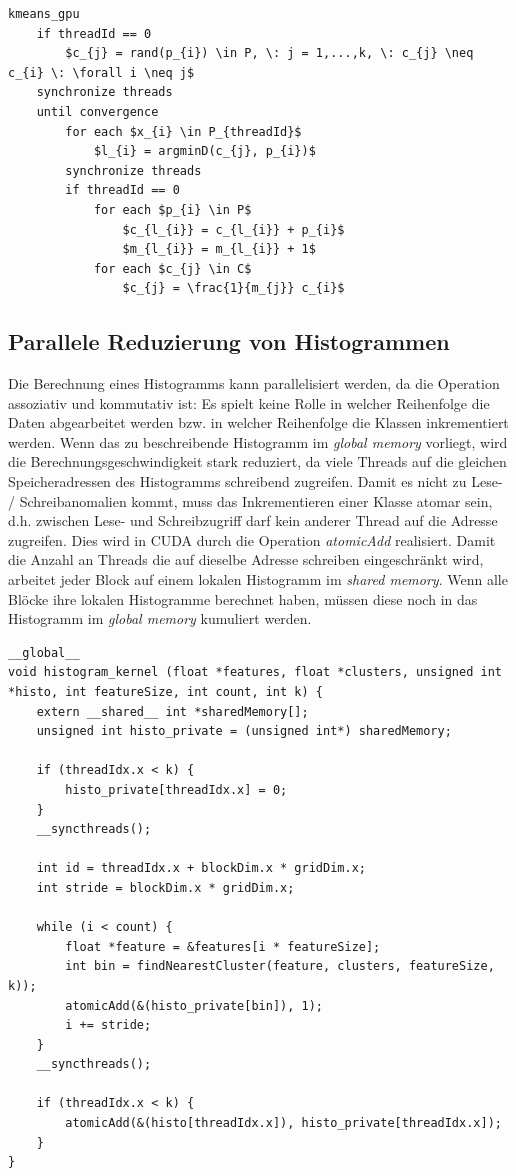 \lstset{language=C}
\begin{lstlisting}[mathescape=true]
kmeans_gpu
	if threadId == 0
		$c_{j} = rand(p_{i}) \in P, \: j = 1,...,k, \: c_{j} \neq c_{i} \: \forall i \neq j$
	synchronize threads
	until convergence
		for each $x_{i} \in P_{threadId}$
			$l_{i} = argminD(c_{j}, p_{i})$
		synchronize threads
		if threadId == 0
			for each $p_{i} \in P$
				$c_{l_{i}} = c_{l_{i}} + p_{i}$
				$m_{l_{i}} = m_{l_{i}} + 1$
			for each $c_{j} \in C$
				$c_{j} = \frac{1}{m_{j}} c_{i}$
\end{lstlisting}

\subsection{Parallele Reduzierung von Histogrammen}

Die Berechnung eines Histogramms kann parallelisiert werden, da die Operation assoziativ und kommutativ ist: Es spielt keine Rolle in welcher Reihenfolge die Daten abgearbeitet werden bzw. in welcher Reihenfolge die Klassen inkrementiert werden. Wenn das zu beschreibende Histogramm im \textit{global memory} vorliegt, wird die Berechnungsgeschwindigkeit stark reduziert, da viele Threads auf die gleichen Speicheradressen des Histogramms schreibend zugreifen. Damit es nicht zu Lese- / Schreibanomalien kommt, muss das Inkrementieren einer Klasse atomar sein, d.h. zwischen Lese- und Schreibzugriff darf kein anderer Thread auf die Adresse zugreifen. Dies wird in CUDA durch die Operation \textit{atomicAdd} realisiert. Damit die Anzahl an Threads die auf dieselbe Adresse schreiben eingeschränkt wird, arbeitet jeder Block auf einem lokalen Histogramm im \textit{shared memory}. Wenn alle Blöcke ihre lokalen Histogramme berechnet haben, müssen diese noch in das Histogramm im \textit{global memory} kumuliert werden. 

\lstset{language=C}
\begin{lstlisting}
__global__
void histogram_kernel (float *features, float *clusters, unsigned int *histo, int featureSize, int count, int k) {
	extern __shared__ int *sharedMemory[];
	unsigned int histo_private = (unsigned int*) sharedMemory;
	
	if (threadIdx.x < k) {
		histo_private[threadIdx.x] = 0;		
	}
	__syncthreads();

	int id = threadIdx.x + blockDim.x * gridDim.x;
	int stride = blockDim.x * gridDim.x;
	
	while (i < count) {
		float *feature = &features[i * featureSize];
		int bin = findNearestCluster(feature, clusters, featureSize, k)); 
		atomicAdd(&(histo_private[bin]), 1);
		i += stride;	
	}
	__syncthreads();
	
	if (threadIdx.x < k) {
		atomicAdd(&(histo[threadIdx.x]), histo_private[threadIdx.x]);		
	}
}
\end{lstlisting} 

